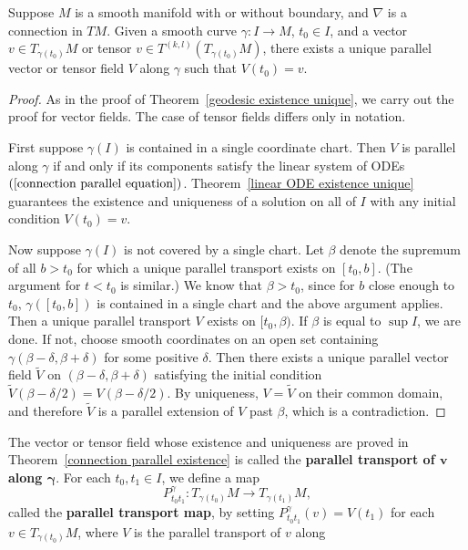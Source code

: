 \begin{theorem}\label{connection parallel existence}
Suppose $M$ is a smooth manifold with or without boundary, and $\nabla$ is a connection in $TM$. Given a smooth curve $\gamma:I\to M$, $t_0\in I$, and a vector 
$v\in T_{\gamma(t_0)}M$ or tensor $v\in T^{(k,l)}(T_{\gamma(t_0)}M)$, there exists a unique parallel vector or tensor field $V$ along $\gamma$ such that $V(t_0)=v$.
\end{theorem}
\begin{proof}
As in the proof of Theorem~\ref{geodesic existence unique}, we carry out the proof for vector fields. The case of tensor fields differs only in notation.\par
First suppose $\gamma(I)$ is contained in a single coordinate chart. Then $V$ is parallel along $\gamma$ if and only if its components satisfy the linear system of ODEs 
$(\ref{connection parallel equation})$. Theorem~\ref{linear ODE existence unique} guarantees the existence and uniqueness of a solution on all of $I$ with any initial 
condition $V(t_0)=v$.\par
Now suppose $\gamma(I)$ is not covered by a single chart. Let $\beta$ denote the supremum of all $b>t_0$ for which a unique parallel transport exists on $[t_0,b]$. 
(The argument for $t<t_0$ is similar.) We know that $\beta>t_0$, since for $b$ close enough to $t_0$, $\gamma([t_0,b])$ is contained in a single chart and the above 
argument applies. Then a unique parallel transport $V$ exists on $[t_0,\beta)$. If $\beta$ is equal to $\sup I$, we are done. If not, choose smooth coordinates on an 
open set containing $\gamma(\beta-\delta,\beta+\delta)$ for some positive $\delta$. Then there exists a unique parallel vector field $\widetilde{V}$ on $(\beta-\delta,\beta+\delta)$ 
satisfying the initial condition $\widetilde{V}(\beta-\delta/2)=V(\beta-\delta/2)$. By uniqueness, $V=\widetilde{V}$ on their common domain, and therefore $\widetilde{V}$ 
is a parallel extension of $V$ past $\beta$, which is a contradiction.
\end{proof}
The vector or tensor field whose existence and uniqueness are proved in Theorem~\ref{connection parallel existence} is called the \textbf{parallel transport of $\bm{v}$ 
along $\bm{\gamma}$}. For each $t_0,t_1\in I$, we define a map
\[P^\gamma_{t_0t_1}:T_{\gamma(t_0)}M\to T_{\gamma(t_1)}M,\]
called the \textbf{parallel transport map}, by setting $P_{t_0t_1}^{\gamma}(v)=V(t_1)$ for each $v\in T_{\gamma(t_0)}M$, where $V$ is the parallel transport of $v$ along 
